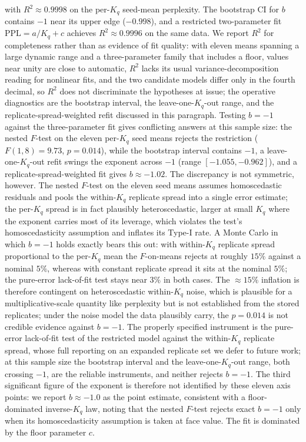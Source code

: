 \documentclass[11pt]{article}
\begin{document}
with $R^2 \approx 0.9998$ on the per-$K_q$ seed-mean perplexity. The bootstrap CI for $b$ contains $-1$ near its upper edge ($-0.998$), and a restricted two-parameter fit $\mathrm{PPL} = a/K_q + c$ achieves $R^2 \approx 0.9996$ on the same data. We report $R^2$ for completeness rather than as evidence of fit quality: with eleven means spanning a large dynamic range and a three-parameter family that includes a floor, values near unity are close to automatic, $R^2$ lacks its usual variance-decomposition reading for nonlinear fits, and the two candidate models differ only in the fourth decimal, so $R^2$ does not discriminate the hypotheses at issue; the operative diagnostics are the bootstrap interval, the leave-one-$K_q$-out range, and the replicate-spread-weighted refit discussed in this paragraph. Testing $b = -1$ against the three-parameter fit gives conflicting answers at this sample size: the nested $F$-test on the eleven per-$K_q$ seed means rejects the restriction ($F(1, 8) = 9.73$, $p = 0.014$), while the bootstrap interval contains $-1$, a leave-one-$K_q$-out refit swings the exponent across $-1$ (range $[-1.055, -0.962]$), and a replicate-spread-weighted fit gives $b \approx -1.02$. The discrepancy is not symmetric, however. The nested $F$-test on the eleven seed means assumes homoscedastic residuals and pools the within-$K_q$ replicate spread into a single error estimate; the per-$K_q$ spread is in fact plausibly heteroscedastic, larger at small $K_q$ where the exponent carries most of its leverage, which violates the test's homoscedasticity assumption and inflates its Type-I rate. A Monte Carlo in which $b = -1$ holds exactly bears this out: with within-$K_q$ replicate spread proportional to the per-$K_q$ mean the $F$-on-means rejects at roughly $15\%$ against a nominal $5\%$, whereas with constant replicate spread it sits at the nominal $5\%$; the pure-error lack-of-fit test stays near $3\%$ in both cases. The $\approx 15\%$ inflation is therefore contingent on heteroscedastic within-$K_q$ noise, which is plausible for a multiplicative-scale quantity like perplexity but is not established from the stored replicates; under the noise model the data plausibly carry, the $p = 0.014$ is not credible evidence against $b = -1$. The properly specified instrument is the pure-error lack-of-fit test of the restricted model against the within-$K_q$ replicate spread, whose full reporting on an expanded replicate set we defer to future work; at this sample size the bootstrap interval and the leave-one-$K_q$-out range, both crossing $-1$, are the reliable instruments, and neither rejects $b = -1$. The third significant figure of the exponent is therefore not identified by these eleven axis points: we report $b \approx -1.0$ as the point estimate, consistent with a floor-dominated inverse-$K_q$ law, noting that the nested $F$-test rejects exact $b = -1$ only when its homoscedasticity assumption is taken at face value. The fit is dominated by the floor parameter $c$.
\end{document}

